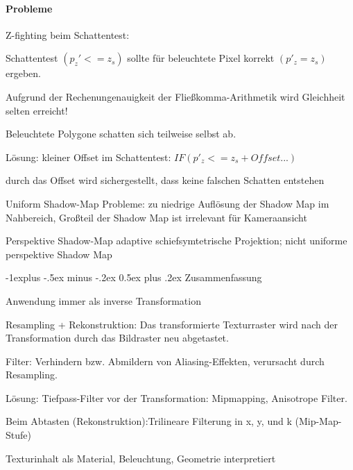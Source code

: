 \documentclass[landscape]{article}
\makeatletter
\renewcommand{\subsection}{\@startsection{subsection}{2}{0mm}%
                                {-1explus -.5ex minus -.2ex}%
                                {0.5ex plus .2ex}%
                                {\normalfont\normalsize\bfseries}}
\makeatother
\begin{document}
\begin{multicols}{3}
  \paragraph{Probleme}
  Z-fighting beim Schattentest:
  \begin{itemize*}
    \item Schattentest $(p_z' <= z_s )$ sollte für beleuchtete Pixel korrekt $(p'_z = z_s)$ ergeben.
    \item Aufgrund der Rechenungenauigkeit der Fließkomma-Arithmetik wird Gleichheit selten erreicht!
    \item Beleuchtete Polygone schatten sich teilweise selbst ab.
    \item Lösung: kleiner Offset im Schattentest: $IF (p'_z <= z_s + Offset...)$
    \item durch das Offset wird sichergestellt, dass keine falschen Schatten entstehen
  \end{itemize*}
  \begin{description*}
    \item[Uniform Shadow-Map] Probleme: zu niedrige Auflösung der Shadow Map im Nahbereich, Großteil der Shadow Map ist irrelevant für Kameraansicht
  \item[Perspektive Shadow-Map] adaptive schiefsymtetrische Projektion; nicht uniforme perspektive Shadow Map
  \end{description*}
  
  \subsection{Zusammenfassung}
  \begin{itemize*}
    \item Anwendung immer als inverse Transformation
    \item Resampling + Rekonstruktion: Das transformierte Texturraster wird nach der Transformation durch das Bildraster neu abgetastet.
    \item Filter: Verhindern bzw. Abmildern von Aliasing-Effekten, verursacht durch Resampling.
    \item Lösung: Tiefpass-Filter vor der Transformation: Mipmapping, Anisotrope Filter.
    \item Beim Abtasten (Rekonstruktion):Trilineare Filterung in x, y, und k (Mip-Map-Stufe)
    \item Texturinhalt als Material, Beleuchtung, Geometrie interpretiert
  \end{itemize*}
  
\end{multicols}
\end{document}
